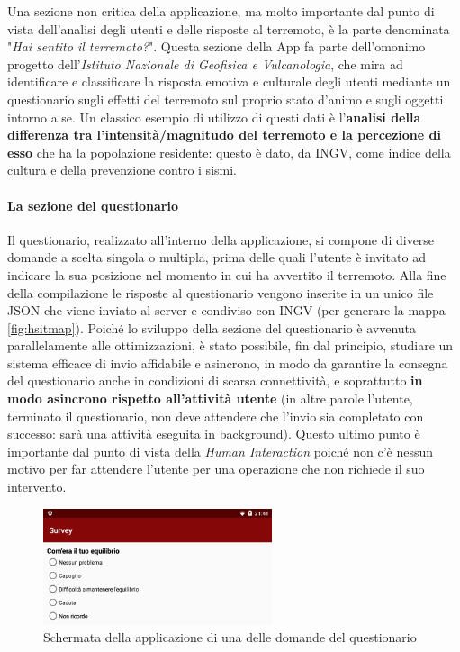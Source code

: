 \documentclass[a4paper,10pt]{memoir}
\begin{document}
Una sezione non critica della applicazione, ma molto importante dal punto di vista dell'analisi degli utenti e delle risposte al terremoto, è la parte denominata "\textit{Hai sentito il terremoto?}". Questa sezione della App fa parte dell'omonimo progetto dell'\textit{Istituto Nazionale di Geofisica e Vulcanologia}, che mira ad identificare e classificare la risposta emotiva e culturale degli utenti mediante un questionario sugli effetti del terremoto sul proprio stato d'animo e sugli oggetti intorno a se. Un classico esempio di utilizzo di questi dati è l'\textbf{analisi della differenza tra l'intensità/magnitudo del terremoto e la percezione di esso} che ha la popolazione residente: questo è dato, da INGV, come indice della cultura e della prevenzione contro i sismi.

\paragraph{La sezione del questionario} Il questionario, realizzato all'interno della applicazione, si compone di diverse domande a scelta singola o multipla, prima delle quali l'utente è invitato ad indicare la sua posizione nel momento in cui ha avvertito il terremoto. Alla fine della compilazione le risposte al questionario vengono inserite in un unico file JSON che viene inviato al server e condiviso con INGV (per generare la mappa \ref{fig:hsitmap}). Poiché lo sviluppo della sezione del questionario è avvenuta parallelamente alle ottimizzazioni, è stato possibile, fin dal principio, studiare un sistema efficace di invio affidabile e asincrono, in modo da garantire la consegna del questionario anche in condizioni di scarsa connettività, e soprattutto \textbf{in modo asincrono rispetto all'attività utente} (in altre parole l'utente, terminato il questionario, non deve attendere che l'invio sia completato con successo: sarà una attività eseguita in background). Questo ultimo punto è importante dal punto di vista della \textit{Human Interaction} poiché non c'è nessun motivo per far attendere l'utente per una operazione che non richiede il suo intervento.

\begin{figure}[ht]
\centering
\label{fig:survey1}
\includegraphics[width=0.6\textwidth]{app/survey2}
\caption{Schermata della applicazione di una delle domande del questionario}
\end{figure}
\end{document}
